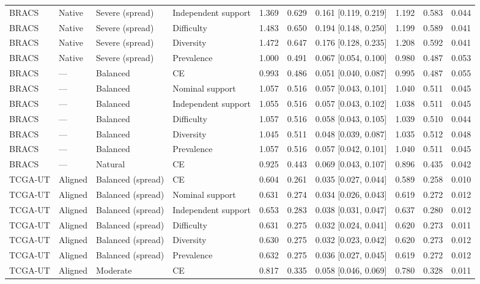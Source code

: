 \begin{longtable}{llllllllll}
BRACS & Native & Severe (spread) & Independent support & 1.369 & 0.629 & 0.161 [0.119, 0.219] & 1.192 & 0.583 & 0.044 \\
BRACS & Native & Severe (spread) & Difficulty & 1.483 & 0.650 & 0.194 [0.148, 0.250] & 1.199 & 0.589 & 0.041 \\
BRACS & Native & Severe (spread) & Diversity & 1.472 & 0.647 & 0.176 [0.128, 0.235] & 1.208 & 0.592 & 0.041 \\
BRACS & Native & Severe (spread) & Prevalence & 1.000 & 0.491 & 0.067 [0.054, 0.100] & 0.980 & 0.487 & 0.053 \\
BRACS & --- & Balanced & CE & 0.993 & 0.486 & 0.051 [0.040, 0.087] & 0.995 & 0.487 & 0.055 \\
BRACS & --- & Balanced & Nominal support & 1.057 & 0.516 & 0.057 [0.043, 0.101] & 1.040 & 0.511 & 0.045 \\
BRACS & --- & Balanced & Independent support & 1.055 & 0.516 & 0.057 [0.043, 0.102] & 1.038 & 0.511 & 0.045 \\
BRACS & --- & Balanced & Difficulty & 1.057 & 0.516 & 0.058 [0.043, 0.105] & 1.039 & 0.510 & 0.044 \\
BRACS & --- & Balanced & Diversity & 1.045 & 0.511 & 0.048 [0.039, 0.087] & 1.035 & 0.512 & 0.048 \\
BRACS & --- & Balanced & Prevalence & 1.057 & 0.516 & 0.057 [0.042, 0.101] & 1.040 & 0.511 & 0.045 \\
BRACS & --- & Natural & CE & 0.925 & 0.443 & 0.069 [0.043, 0.107] & 0.896 & 0.435 & 0.042 \\
TCGA-UT & Aligned & Balanced (spread) & CE & 0.604 & 0.261 & 0.035 [0.027, 0.044] & 0.589 & 0.258 & 0.010 \\
TCGA-UT & Aligned & Balanced (spread) & Nominal support & 0.631 & 0.274 & 0.034 [0.026, 0.043] & 0.619 & 0.272 & 0.012 \\
TCGA-UT & Aligned & Balanced (spread) & Independent support & 0.653 & 0.283 & 0.038 [0.031, 0.047] & 0.637 & 0.280 & 0.012 \\
TCGA-UT & Aligned & Balanced (spread) & Difficulty & 0.631 & 0.275 & 0.032 [0.024, 0.041] & 0.620 & 0.273 & 0.011 \\
TCGA-UT & Aligned & Balanced (spread) & Diversity & 0.630 & 0.275 & 0.032 [0.023, 0.042] & 0.620 & 0.273 & 0.012 \\
TCGA-UT & Aligned & Balanced (spread) & Prevalence & 0.632 & 0.275 & 0.036 [0.027, 0.045] & 0.619 & 0.272 & 0.012 \\
TCGA-UT & Aligned & Moderate & CE & 0.817 & 0.335 & 0.058 [0.046, 0.069] & 0.780 & 0.328 & 0.011 \\

\end{longtable}
